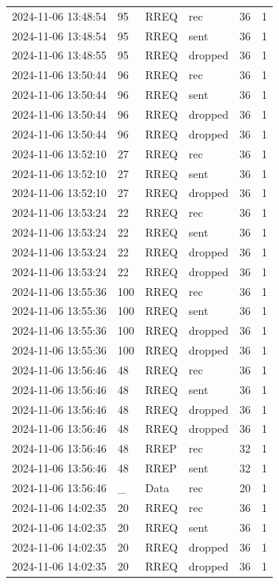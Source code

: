 \documentclass[]{nsm-thesis}
\begin{document}
\begin{longtable}{llllll}
2024-11-06 13:48:54 & 95 & RREQ & rec & 36 & 1 \\
2024-11-06 13:48:54 & 95 & RREQ & sent & 36 & 1 \\
2024-11-06 13:48:55 & 95 & RREQ & dropped & 36 & 1 \\
2024-11-06 13:50:44 & 96 & RREQ & rec & 36 & 1 \\
2024-11-06 13:50:44 & 96 & RREQ & sent & 36 & 1 \\
2024-11-06 13:50:44 & 96 & RREQ & dropped & 36 & 1 \\
2024-11-06 13:50:44 & 96 & RREQ & dropped & 36 & 1 \\
2024-11-06 13:52:10 & 27 & RREQ & rec & 36 & 1 \\
2024-11-06 13:52:10 & 27 & RREQ & sent & 36 & 1 \\
2024-11-06 13:52:10 & 27 & RREQ & dropped & 36 & 1 \\
2024-11-06 13:53:24 & 22 & RREQ & rec & 36 & 1 \\
2024-11-06 13:53:24 & 22 & RREQ & sent & 36 & 1 \\
2024-11-06 13:53:24 & 22 & RREQ & dropped & 36 & 1 \\
2024-11-06 13:53:24 & 22 & RREQ & dropped & 36 & 1 \\
2024-11-06 13:55:36 & 100 & RREQ & rec & 36 & 1 \\
2024-11-06 13:55:36 & 100 & RREQ & sent & 36 & 1 \\
2024-11-06 13:55:36 & 100 & RREQ & dropped & 36 & 1 \\
2024-11-06 13:55:36 & 100 & RREQ & dropped & 36 & 1 \\
2024-11-06 13:56:46 & 48 & RREQ & rec & 36 & 1 \\
2024-11-06 13:56:46 & 48 & RREQ & sent & 36 & 1 \\
2024-11-06 13:56:46 & 48 & RREQ & dropped & 36 & 1 \\
2024-11-06 13:56:46 & 48 & RREQ & dropped & 36 & 1 \\
2024-11-06 13:56:46 & 48 & RREP & rec & 32 & 1 \\
2024-11-06 13:56:46 & 48 & RREP & sent & 32 & 1 \\
2024-11-06 13:56:46 & _ & Data & rec & 20 & 1 \\
2024-11-06 14:02:35 & 20 & RREQ & rec & 36 & 1 \\
2024-11-06 14:02:35 & 20 & RREQ & sent & 36 & 1 \\
2024-11-06 14:02:35 & 20 & RREQ & dropped & 36 & 1 \\
2024-11-06 14:02:35 & 20 & RREQ & dropped & 36 & 1 \\

\end{longtable}
\end{document}
